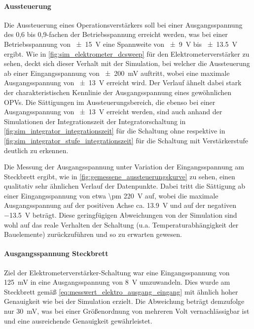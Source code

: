 \documentclass[12pt,english,ngerman]{scrartcl}
\begin{document}
\paragraph{Aussteuerung}
Die Aussteuerung eines Operationsverstärkers soll bei einer Ausgangsspannung
des 0,6 bis 0,9-fachen der Betriebsspannung erreicht werden, was bei einer
Betriebsspannung von \SI{\pm 15}{\volt} eine Spannweite von \SI{\pm 9}{\volt}
bis \SI{\pm 13,5}{\volt} ergibt. Wie in \autoref{fig:sim_elektrometer_dcsweep}
für den Elektrometerverstärker zu sehen, deckt sich dieser Verhalt mit der
Simulation, bei welcher die Aussteuerung ab einer Eingangsspannung von 
\SI{\pm 200}{\milli\volt} auftritt, wobei eine maximale Ausgangsspannung von
\SI{\pm 13}{\volt} erreicht wird. Der Verlauf ähnelt dabei stark der
charakteristischen Kennlinie der Ausgangsspannung eines gewöhnlichen OPVs. Die
Sättigungen im Aussteuerungsbereich, die ebenso bei einer Ausgangsspannung von
\SI{\pm 13}{\volt} erreicht werden, sind auch anhand der Simulationen der
Integrationszeit der Integratorschaltung in
\autoref{fig:sim_integrator_integrationszeit} für die Schaltung ohne respektive
in \autoref{fig:sim_integrator_stufe_integrationszeit} für die Schaltung mit
Verstärkerstufe deutlich zu erkennen. 

Die Messung der Ausgangsspannung unter Variation der Eingangsspannung am
Steckbrett ergibt, wie in \autoref{fig:gemessene_aussteuerungskurve} zu sehen,
einen qualitativ sehr ähnlichen Verlauf der Datenpunkte. 
Dabei tritt die Sättigung ab einer Eingangsspannung von etwa \SI{\pm
220}{\volt} auf, wobei die maximale Ausgangsspannung auf der positiven Achse
ca. \SI{13,9}{\volt} und auf der negativen \SI{-13,5}{\volt} beträgt. Diese
geringfügigen Abweichungen von der Simulation sind wohl auf das reale Verhalten
der Schaltung (u.a. Temperaturabhängigkeit der Bauelemente) zurückzuführen und
so zu erwarten gewesen.

\paragraph{Ausgangsspannung Steckbrett}
Ziel der Elektrometerverstärker-Schaltung war eine Eingangsspannung von
\SI{125}{\milli\volt} in eine Ausgangsspannung von \SI{8}{\volt} umzuwandeln.
Dies wurde am Steckbrett gemäß \autoref{eq:messwert_elektro_ausgang_eingang}
mit ähnlich hoher Genauigkeit wie bei der Simulation erzielt. Die Abweichung
beträgt demzufolge nur \SI{30}{\milli\volt}, was bei einer Größenordnung von
mehreren Volt vernachlässigbar ist und eine ausreichende Genauigkeit
gewährleistet.
\end{document}
